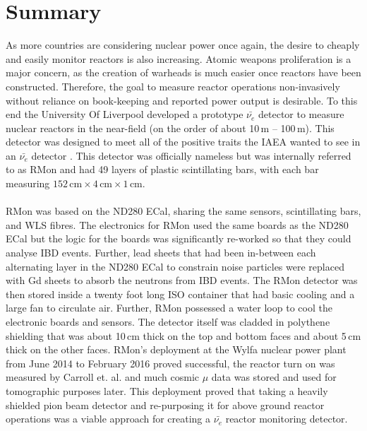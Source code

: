 
\chapter{Summary}

\ifpdf
    \graphicspath{{Chapter7/Figs/Raster/}{Chapter6/Figs/PDF/}{Chapter6/Figs/}}
\else
    \graphicspath{{Chapter7/Figs/Vector/}{Chapter7/Figs/}}
\fi

As more countries are considering nuclear power once again, the desire to cheaply and easily monitor reactors is also increasing. Atomic weapons proliferation is a major concern, as the creation of warheads is much easier once reactors have been constructed. Therefore, the goal to measure reactor operations non-invasively without reliance on book-keeping and reported power output is desirable. To this end the University Of Liverpool developed a prototype $\bar{\nu_e}$ detector to measure nuclear reactors in the near-field (on the order of about 10\,m -- 100\,m). This detector was designed to meet all of the positive traits the IAEA wanted to see in an $\bar{\nu_e}$ detector \cite{IAEA_2008}. This detector was officially nameless but was internally referred to as RMon and had 49 layers of plastic scintillating bars, with each bar measuring $152\,\textrm{cm} \times 4\,\textrm{cm} \times 1\,\textrm{cm}$.
\\\\RMon was based on the ND280 ECal, sharing the same sensors, scintillating bars, and WLS fibres. The electronics for RMon used the same boards as the ND280 ECal but the logic for the boards was significantly re-worked so that they could analyse IBD events. Further, lead sheets that had been in-between each alternating layer in the ND280 ECal to constrain noise particles were replaced with Gd sheets to absorb the neutrons from IBD events. The RMon detector was then stored inside a twenty foot long ISO container that had basic cooling and a large fan to circulate air. Further, RMon possessed a water loop to cool the electronic boards and sensors. The detector itself was cladded in polythene shielding that was about 10\,cm thick on the top and bottom faces and about 5\,cm thick on the other faces. RMon's deployment at the Wylfa nuclear power plant from June 2014 to February 2016 proved successful, the reactor turn on was measured by Carroll et. al. \cite{Carroll_2018} and much cosmic $\mu$ data was stored and used for tomographic purposes later. This deployment proved that taking a heavily shielded pion beam detector and re-purposing it for above ground reactor operations was a viable approach for creating a $\bar{\nu_e}$ reactor monitoring detector. 
